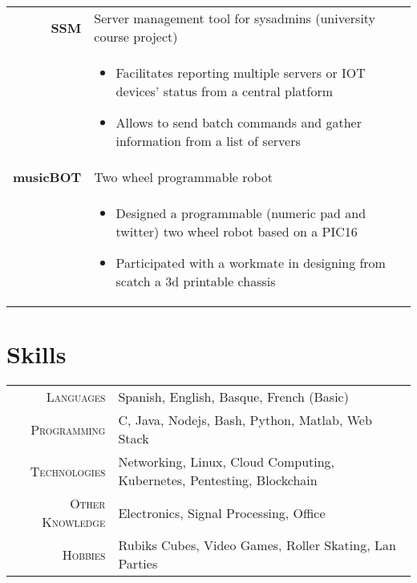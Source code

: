 \documentclass[a4paper,10pt]{article}
\begin{document}
\begin{tabular}{rp{13.25cm}}
 \textbf{SSM}& Server management tool for sysadmins (university course project)\\
 & \footnotesize{ \begin{itemize}[noitemsep,topsep=-10pt]
 \vspace{-0.1in}
 \item Facilitates reporting multiple servers or IOT devices' status from a central platform 
 \item Allows to send batch commands and gather information from a list of servers
 \end{itemize}} \\

 \textbf{musicBOT}& Two wheel programmable robot\\
 & \footnotesize{ \begin{itemize}[noitemsep,topsep=-10pt]
 \vspace{-0.1in}
 \item Designed a programmable (numeric pad and twitter) two wheel robot based on a PIC16
 \item Participated with a workmate in designing from scatch a 3d printable chassis
 \end{itemize}} \\

\end{tabular}

\section{Skills}
\begin{tabular}{r|l}
\textsc{Languages} & Spanish, English, Basque, French (Basic) \\
\textsc{Programming} & C, Java, Nodejs, Bash, Python, Matlab, Web Stack \\
\textsc{Technologies} & Networking, Linux, Cloud Computing, Kubernetes, Pentesting, Blockchain  \\
\textsc{Other Knowledge} & Electronics, Signal Processing, Office \\
\textsc{Hobbies} & Rubiks Cubes, Video Games, Roller Skating, Lan Parties
\end{tabular}
\end{document}
